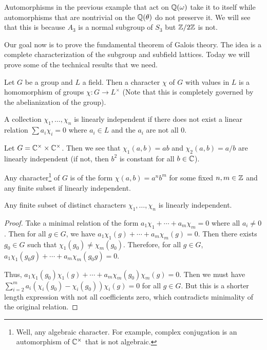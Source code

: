 \documentclass[10pt, twoside]{article}
\begin{document}
    \begin{rmk} Automorphisms in the previous example that act on $\mathbb{Q}(\omega)$
        take it to itself while automorphisms that are nontrivial on the
        $\mathbb{Q}(\theta)$ do not preserve it. We will see that this is because $A_3$
        is a normal subgroup of $S_3$ but $\mathbb{Z}/2\mathbb{Z}$ is not.  \end{rmk}

    Our goal now is to prove the fundamental theorem of Galois theory. The idea
    is a complete characterization of the subgroup and subfield lattices. Today
    we will prove some of the technical results that we need.

    \begin{defn}[Character] Let $G$ be a group and $L$ a field. Then a
        character $\chi$ of $G$ with values in $L$ is a homomorphism of groups
        $\chi: G \rightarrow L^{\times}$ (Note that this is completely governed
        by the abelianization of the group).  \end{defn}

    \begin{defn} A collection $\chi_1, \ldots, \chi_n$ is
    linearly independent if there does not exist a linear relation $\sum a_i
\chi_i = 0$ where $a_i \in L$ and the $a_i$ are not all $0$.  \end{defn}

    \begin{exm} Let $G = \mathbb{C}^{\times} \times \mathbb{C}^{\times}$. Then we see that
    $\chi_1(a,b) = ab$ and $\chi_2(a,b) = a/b$ are linearly independent (if
not, then $b^2$ is constant for all $b \in \mathbb{C}$).  \end{exm}

    \begin{rmk} Any character\footnote{Well, any algebraic character. For
        example, complex conjugation is an automorphism of $\mathbb{C}^{\times}$ that
    is not algebraic.} of $G$ is of the form $\chi(a,b) = a^nb^m$ for some
    fixed $n,m \in \mathbb{Z}$ and any finite subset if linearly independent.
\end{rmk}

    \begin{thm} Any finite subset of distinct characters $\chi_1, \ldots,
        \chi_n$ is linearly independent.  \begin{proof} Take a minimal relation
            of the form $a_1 \chi_1 + \cdots + a_m\chi_m = 0$ where all $a_i
            \neq 0$. Then for all $g \in G$, we have $a_1\chi_1(g) + \cdots +
            a_m\chi_m(g) = 0$. Then there exists $g_0 \in G$ such that
            $\chi_1(g_0) \neq \chi_m(g_0)$. Therefore, for all $g \in G$,
            $a_1\chi_1(g_0g) + \cdots + a_m\chi_m(g_0g) = 0$.

            Thus, $a_1\chi_1(g_0)\chi_1(g) + \cdots + a_m\chi_m(g_0)\chi_m(g) =
        0$. Then we must have $\sum_{i=2}^m a_i(\chi_i(g_0) -
    \chi_i(g_0))\chi_i(g) = 0$ for all $g\in G$. But this is a shorter length
expression with not all coefficients zero, which contradicts minimality of the
original relation.  \end{proof} \end{thm}
\end{document}
